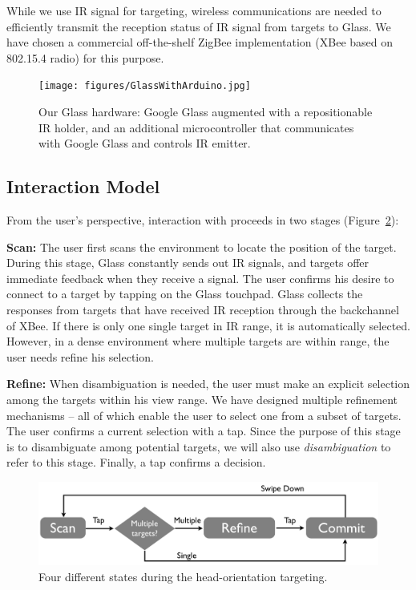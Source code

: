 While we use IR signal for targeting, wireless communications are needed to efficiently transmit the reception status of IR signal from targets to Glass. We have chosen a commercial off-the-shelf ZigBee implementation (XBee based on 802.15.4 radio) for this purpose.


\begin{figure}[t]
\centering
\texttt{[image: figures/GlassWithArduino.jpg]}
\caption{Our Glass hardware: Google Glass augmented with a repositionable IR holder, and an additional microcontroller that communicates with Google Glass and controls IR emitter.}
\label{fig:glass}
\end{figure}

\subsection{Interaction Model}
From the user's perspective, interaction with \systemname proceeds in two stages (Figure~\ref{fig:interaction}): 

{\bf Scan:} The user first scans the environment to locate the position of the target. During this stage, Glass constantly sends out IR signals, and  targets offer immediate feedback when they receive a signal. The user confirms his desire to connect to a target by tapping on the Glass touchpad. Glass collects the responses from targets that have received IR reception through the backchannel of XBee. If there is only one single target in IR range, it is automatically selected. However, in a dense environment where multiple targets are within range, the user needs refine his selection.

{\bf Refine:} When disambiguation is needed, the user must make an explicit selection among the targets within his view range. We have designed multiple refinement mechanisms -- all of which enable the user to select one from a subset of targets. The user confirms a current selection with a tap. Since the purpose of this stage is to disambiguate among potential targets, we will also use {\em disambiguation} to refer to this stage. Finally, a tap confirms a decision.

\begin{figure}[t!]
\centering
\includegraphics[width=\columnwidth]{figures/interactionModel2.pdf}
\caption{Four different states during the head-orientation targeting.}
\label{fig:interaction}
\end{figure}

